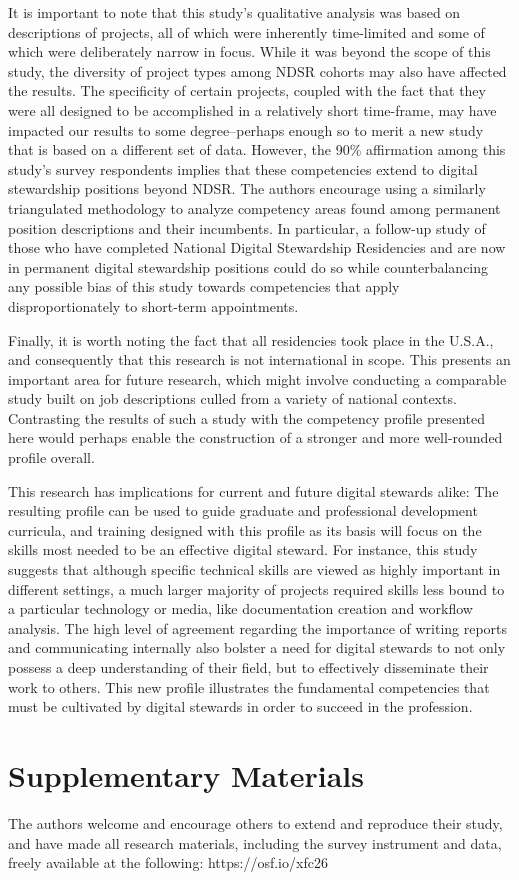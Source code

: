 \documentclass{acm_proc_article-sp}
\begin{document}
It is important to note that this study's qualitative analysis was based on descriptions of projects, all of which were inherently time-limited and some of which were deliberately narrow in focus. While it was beyond the scope of this study, the diversity of project types among NDSR cohorts may also have affected the results. The specificity of certain projects, coupled with the fact that they were all designed to be accomplished in a relatively short time-frame, may have impacted our results to some degree--perhaps enough so to merit a new study that is based on a different set of data. However, the 90\% affirmation among this study's survey respondents implies that these competencies extend to digital stewardship positions beyond NDSR. The authors encourage using a similarly triangulated methodology to analyze competency areas found among permanent position descriptions and their incumbents. In particular, a follow-up study of those who have completed National Digital Stewardship Residencies and are now in permanent digital stewardship positions could do so while counterbalancing any possible bias of this study towards competencies that apply disproportionately to short-term appointments. 

Finally, it is worth noting the fact that all residencies took place in the U.S.A., and consequently that this research is not international in scope. This presents an important area for future research, which might involve conducting a comparable study built on job descriptions culled from a variety of national contexts. Contrasting the results of such a study with the competency profile presented here would perhaps enable the construction of a stronger and more well-rounded profile overall.

This research has implications for current and future digital stewards alike: The resulting profile can be used to guide graduate and professional development curricula, and training designed with this profile as its basis will focus on the skills most needed to be an effective digital steward. For instance, this study suggests that although specific technical skills are viewed as highly important in different settings, a much larger majority of projects required skills less bound to a particular technology or media, like documentation creation and workflow analysis. The high level of agreement regarding the importance of writing reports and communicating internally also bolster a need for digital stewards to not only possess a deep understanding of their field, but to effectively disseminate their work to others. This new profile illustrates the fundamental competencies that must be cultivated by digital stewards in order to succeed in the profession. 

\section{Supplementary Materials}
The authors welcome and encourage others to extend and reproduce their study, and have made all research materials, including the survey instrument and data, freely available at the following: https://osf.io/xfc26




\end{document}

